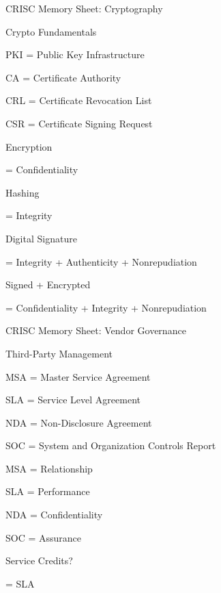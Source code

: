 \documentclass{beamer}
\begin{document}
	\begin{frame}[shrink=10]{CRISC Memory Sheet: Cryptography}
		\begin{block}{Crypto Fundamentals}
			
			PKI = Public Key Infrastructure
			
			CA = Certificate Authority
			
			CRL = Certificate Revocation List
			
			CSR = Certificate Signing Request
			
			\vspace{0.15cm}
			
			Encryption
			
			= Confidentiality
			
			Hashing
			
			= Integrity
			
			Digital Signature
			
			= Integrity + Authenticity + Nonrepudiation
			
			\vspace{0.15cm}
			
			Signed + Encrypted
			
			= Confidentiality + Integrity + Nonrepudiation
			
		\end{block}
	\end{frame}
	
	\begin{frame}[shrink=10]{CRISC Memory Sheet: Vendor Governance}
		\begin{block}{Third-Party Management}
			
			MSA = Master Service Agreement
			
			SLA = Service Level Agreement
			
			NDA = Non-Disclosure Agreement
			
			SOC = System and Organization Controls Report
			
			\vspace{0.15cm}
			
			MSA = Relationship
			
			SLA = Performance
			
			NDA = Confidentiality
			
			SOC = Assurance
			
			\vspace{0.15cm}
			
			Service Credits?
			
			= SLA
			
		\end{block}
	\end{frame}
	
\end{document}
